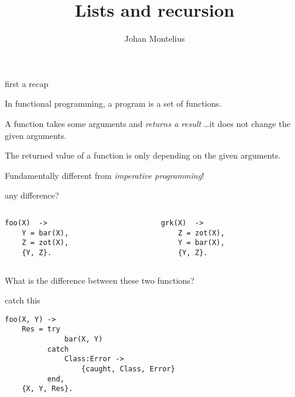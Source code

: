 

\title[ID1019 Recursion]{Lists and recursion}


\author{Johan Montelius}
\date{\semester}



\begin{frame}
\titlepage
\end{frame}

\begin{frame}{first a recap}

\pause In functional programming, a program is a set of functions.

\vspace{20pt}\pause A function takes some arguments and {\em returns a result} \ldots it does not change the given arguments.

\vspace{20pt}\pause The returned value of a function is only depending on the given arguments.

\vspace{20pt}\pause Fundamentally different from {\em imperative programming}!


\end{frame}

\begin{frame}[fragile]{any difference?}

\begin{columns}
 \begin{column}{0.5\linewidth}
\begin{verbatim} 
foo(X)  -> 
    Y = bar(X),
    Z = zot(X),
    {Y, Z}.
\end{verbatim}
 \end{column}
 \pause  
  \begin{column}{0.5\linewidth}
\begin{verbatim} 
grk(X)  -> 
    Z = zot(X),
    Y = bar(X),
    {Y, Z}.
\end{verbatim}
 \end{column}
\end{columns}

\vspace{40pt} 
\pause What is the difference between these two functions?

\end{frame}

\begin{frame}[fragile]{catch this}
\begin{verbatim}
foo(X, Y) ->
    Res = try 
              bar(X, Y)
          catch
              Class:Error ->
                  {caught, Class, Error}
          end,
    {X, Y, Res}.
\end{verbatim}
\end{frame}

